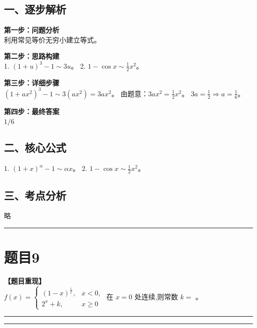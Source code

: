 \documentclass[12pt, a4paper]{ctexart}
\newcommand{\TopSeparator}{
    \par\noindent\rule{\textwidth}{1.5pt}\vspace{0.5em} %
}
\newcommand{\AnalysisSeparator}{
    \par\noindent\rule{\textwidth}{0.5pt}\vspace{0.2em}\hrule\vspace{0.5em} %
}
\newenvironment{RedAnalysis}{
    \par
    \color{red} %
}{
    \par
    \color{black} %
}
\begin{document}
\begin{RedAnalysis}

\subsection*{一、逐步解析}

\textbf{第一步：问题分析} \\
利用常见等价无穷小建立等式。

\textbf{第二步：思路构建} \\
1. $(1+u)^3 - 1 \sim 3u$。
2. $1 - \cos x \sim \frac{1}{2}x^2$。

\textbf{第三步：详细步骤} \\
$(1 + ax^{2})^{3} - 1 \sim 3(ax^2) = 3ax^2$。
由题意：$3ax^2 = \frac{1}{2}x^2$。
$3a = \frac{1}{2} \Rightarrow a = \frac{1}{6}$。

\textbf{第四步：最终答案} \\
$1/6$

\subsection*{二、核心公式}
1. $(1+x)^\alpha - 1 \sim \alpha x$。
2. $1-\cos x \sim \frac{1}{2}x^2$。

\subsection*{三、考点分析}
略

\end{RedAnalysis}

\vspace{2em}

\TopSeparator
\section*{题目9}

\textbf{【题目重现】} \\
$ f(x)=\begin{cases}(1-x)^{\frac{1}{x}}, & x<0,\\ 2^{x}+k, & x\geq0\end{cases} $ 在 $ x=0 $ 处连续,则常数 $ k= $ \underline{\hspace{2cm}}。

\AnalysisSeparator
\end{document}
